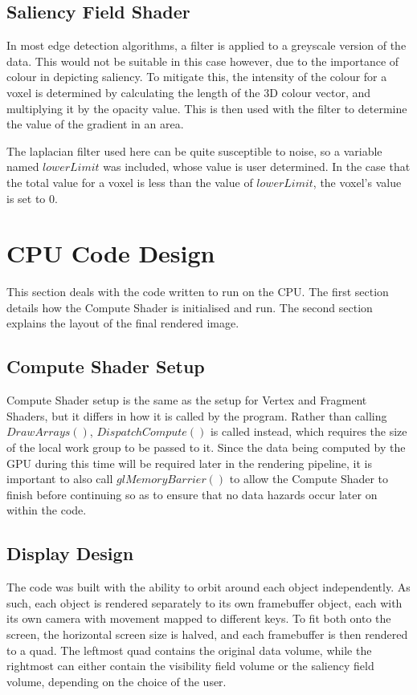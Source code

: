 \subsection{Saliency Field Shader}

In most edge detection algorithms, a filter is applied to a greyscale version of the data. This would not be suitable in this case however, due to the importance of colour in depicting saliency. To mitigate this, the intensity of the colour for a voxel is determined by calculating the length of the 3D colour vector, and multiplying it by the opacity value. This is then used with the filter to determine the value of the gradient in an area.

The laplacian filter used here can be quite susceptible to noise, so a variable named $lowerLimit$ was included, whose value is user determined. In the case that the total value for a voxel is less than the value of $lowerLimit$, the voxel's value is set to 0.

\section{CPU Code Design}

This section deals with the code written to run on the CPU. The first section details how the Compute Shader is initialised and run. The second section explains the layout of the final rendered image.

\subsection{Compute Shader Setup}

Compute Shader setup is the same as the setup for Vertex and Fragment Shaders, but it differs in how it is called by the program. Rather than calling $DrawArrays()$, $DispatchCompute()$ is called instead, which requires the size of the local work group to be passed to it. Since the data being computed by the GPU during this time will be required later in the rendering pipeline, it is important to also call $glMemoryBarrier()$ to allow the Compute Shader to finish before continuing so as to ensure that no data hazards occur later on within the code.

\subsection{Display Design}

The code was built with the ability to orbit around each object independently. As such, each object is rendered separately to its own framebuffer object, each with its own camera with movement mapped to different keys. To fit both onto the screen, the horizontal screen size is halved, and each framebuffer is then rendered to a quad. The leftmost quad contains the original data volume, while the rightmost can either contain the visibility field volume or the saliency field volume, depending on the choice of the user.